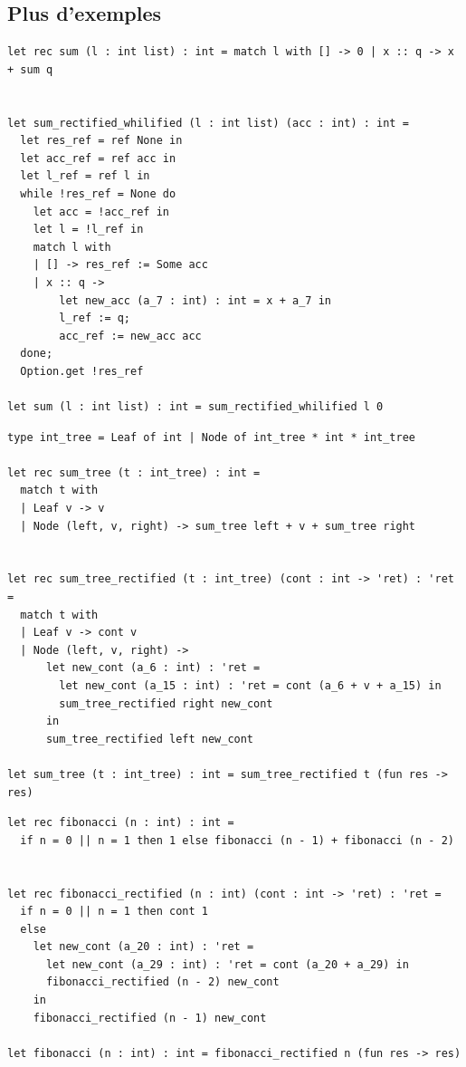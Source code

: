 \pagebreak

\subsection{Plus d'exemples}

\begin{verbatim}
let rec sum (l : int list) : int = match l with [] -> 0 | x :: q -> x + sum q


let sum_rectified_whilified (l : int list) (acc : int) : int =
  let res_ref = ref None in
  let acc_ref = ref acc in
  let l_ref = ref l in
  while !res_ref = None do
    let acc = !acc_ref in
    let l = !l_ref in
    match l with
    | [] -> res_ref := Some acc
    | x :: q ->
        let new_acc (a_7 : int) : int = x + a_7 in
        l_ref := q;
        acc_ref := new_acc acc
  done;
  Option.get !res_ref

let sum (l : int list) : int = sum_rectified_whilified l 0
\end{verbatim}




\begin{verbatim}
type int_tree = Leaf of int | Node of int_tree * int * int_tree

let rec sum_tree (t : int_tree) : int =
  match t with
  | Leaf v -> v
  | Node (left, v, right) -> sum_tree left + v + sum_tree right


let rec sum_tree_rectified (t : int_tree) (cont : int -> 'ret) : 'ret =
  match t with
  | Leaf v -> cont v
  | Node (left, v, right) ->
      let new_cont (a_6 : int) : 'ret =
        let new_cont (a_15 : int) : 'ret = cont (a_6 + v + a_15) in
        sum_tree_rectified right new_cont
      in
      sum_tree_rectified left new_cont

let sum_tree (t : int_tree) : int = sum_tree_rectified t (fun res -> res)
\end{verbatim}


\begin{verbatim}
let rec fibonacci (n : int) : int =
  if n = 0 || n = 1 then 1 else fibonacci (n - 1) + fibonacci (n - 2)

    
let rec fibonacci_rectified (n : int) (cont : int -> 'ret) : 'ret =
  if n = 0 || n = 1 then cont 1
  else
    let new_cont (a_20 : int) : 'ret =
      let new_cont (a_29 : int) : 'ret = cont (a_20 + a_29) in
      fibonacci_rectified (n - 2) new_cont
    in
    fibonacci_rectified (n - 1) new_cont

let fibonacci (n : int) : int = fibonacci_rectified n (fun res -> res)    
\end{verbatim}

